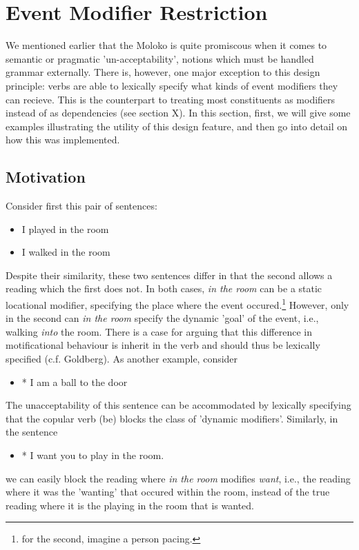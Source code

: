  \section{Event Modifier Restriction} \label{sec-Event-Modifier-Restriction}
We mentioned earlier that the Moloko is quite promiscous when it comes to  semantic or pragmatic 'un-acceptability', notions which must be handled grammar externally. There is, however, one major exception to this design principle: verbs are able to lexically specify what kinds of event modifiers they can recieve. This is the counterpart to treating most constituents as modifiers instead of as dependencies (see section X). In this section, first, we will give some examples illustrating the utility of this design feature, and then go into detail on how this was implemented.
\subsection{Motivation}
Consider first this pair of sentences:
\begin{itemize}
\item I played in the room
\item I walked in the room
\end{itemize}
Despite their similarity, these two sentences differ in that the second allows a reading which the first does not. 
In both cases, \emph{in the room} can be a static locational modifier, specifying the place where the event occured.\footnote{for the second, imagine a person pacing.} However, only in the second can \emph{in the room} specify the dynamic 'goal' of the event, i.e., walking \emph{into} the room. There is a case for arguing that this difference in motificational behaviour is inherit in the verb 
and should thus be lexically specified (c.f. Goldberg).  As another example, consider
\begin{itemize}
\item* I am a ball to the door
\end{itemize}
The unacceptability of this sentence can be accommodated by lexically specifying that the copular verb (be) blocks the class of 'dynamic modifiers'. Similarly, in the sentence
\begin{itemize}
\item* I want you to play in the room.
\end{itemize}
we can easily block the reading where \emph{in the room} modifies \emph{want}, i.e., the reading where it was the 'wanting' that occured within the room, instead of the true reading where it is the playing in the room that is wanted.


